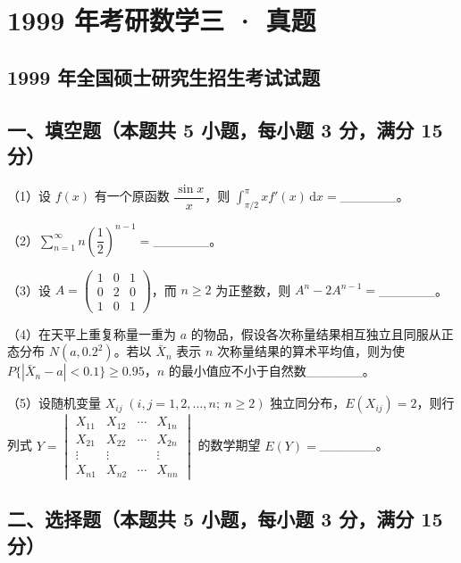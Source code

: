 \documentclass[UTF8,12pt]{ctexart}
\begin{document}
\section*{1999 年考研数学三 · 真题}
\subsection*{1999 年全国硕士研究生招生考试试题}

\subsection*{一、填空题（本题共 5 小题，每小题 3 分，满分 15 分）}

（1）设 \(\displaystyle f(x)\) 有一个原函数 \(\displaystyle \dfrac{\displaystyle \sin x}{\displaystyle x}\)，则 \(\displaystyle \int_{\pi/2}^{\pi}xf'(x)\,\mathrm dx=\)\_\_\_\_\_\_。


（2）\(\displaystyle \sum_{n=1}^{\infty}n\left(\dfrac{\displaystyle 1}{\displaystyle 2}\right)^{n-1}=\)\_\_\_\_\_\_。


（3）设 \(\displaystyle A=\begin{pmatrix}1&0&1\\0&2&0\\1&0&1\end{pmatrix}\)，而 \(\displaystyle n\ge2\) 为正整数，则 \(\displaystyle A^n-2A^{n-1}=\)\_\_\_\_\_\_。


（4）在天平上重复称量一重为 \(\displaystyle a\) 的物品，假设各次称量结果相互独立且同服从正态分布 \(\displaystyle N(a,\allowbreak 0.2^2)\)。若以 \(\displaystyle \bar X_n\) 表示 \(\displaystyle n\) 次称量结果的算术平均值，则为使 \(\displaystyle P\{|\bar X_n-a|<0.1\}\ge0.95\)，\(\displaystyle n\) 的最小值应不小于自然数\_\_\_\_\_\_。


（5）设随机变量 \(\displaystyle X_{ij}\;(i,\allowbreak j=1,\allowbreak 2,\allowbreak \ldots,\allowbreak n;\ n\ge2)\) 独立同分布，\(\displaystyle E(X_{ij})=2\)，则行列式 \(\displaystyle Y=\begin{vmatrix}X_{11}&X_{12}&\cdots&X_{1n}\\X_{21}&X_{22}&\cdots&X_{2n}\\\vdots&\vdots&&\vdots\\X_{n1}&X_{n2}&\cdots&X_{nn}\end{vmatrix}\) 的数学期望 \(\displaystyle E(Y)=\)\_\_\_\_\_\_。


\subsection*{二、选择题（本题共 5 小题，每小题 3 分，满分 15 分）}
\end{document}
